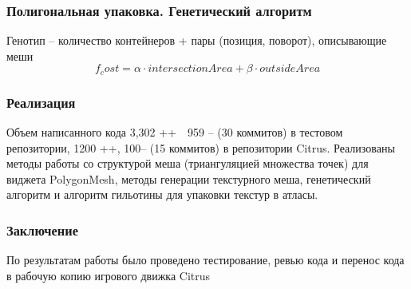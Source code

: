 \documentclass[10pt, unicode]{beamer}
\begin{document}
    \begin{frame}
        \frametitle{Полигональная упаковка. Генетический алгоритм}
        Генотип -- количество контейнеров + пары (позиция, поворот), описывающие меши
        \[
            f_cost = \alpha \cdot intersectionArea  + \beta \cdot outsideArea
        \]
    \end{frame}
    \begin{frame}
        \frametitle{Реализация}
        Объем написанного кода 3,302 ++  959 -- (30 коммитов) в тестовом репозитории, 1200 ++, 100-- (15 коммитов) 
        в репозитории Citrus. Реализованы методы работы со структурой меша (триангуляцией множества точек) для 
        виджета PolygonMesh, методы генерации текстурного меша, генетический алгоритм и алгоритм гильотины для упаковки текстур в атласы.  
    \end{frame}
    \begin{frame}
        \frametitle{Заключение}
        По результатам работы было проведено тестирование, ревью кода и перенос кода в рабочую копию игрового движка 
        Citrus
    \end{frame}
\end{document}
